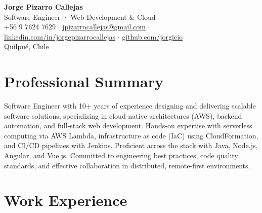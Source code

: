 \documentclass[11pt,a4paper]{article}
\begin{document}
\begin{center}
    {\Huge \textbf{Jorge Pizarro Callejas}}\\[4pt]
    {\large Software Engineer · Web Development \& Cloud}\\[6pt]
    +56 9 7624 7629 \; $\cdot$ \; \href{mailto:jpizarrocallejas@gmail.com}{jpizarrocallejas@gmail.com} \; $\cdot$ \;
    \href{https://linkedin.com/in/jorgepizarrocallejas}{linkedin.com/in/jorgepizarrocallejas} \; $\cdot$ \;
    \href{https://github.com/jorgicio}{github.com/jorgicio}\\[2pt]
    Quilpué, Chile
\end{center}

\vspace{4pt}

\section*{Professional Summary}
Software Engineer with 10+ years of experience designing and delivering scalable software solutions, specializing in cloud-native architectures (AWS), backend automation, and full-stack web development. Hands-on expertise with serverless computing via AWS Lambda, infrastructure as code (IaC) using CloudFormation, and CI/CD pipelines with Jenkins. Proficient across the stack with Java, Node.js, Angular, and Vue.js. Committed to engineering best practices, code quality standards, and effective collaboration in distributed, remote-first environments.



\section*{Work Experience}
\end{document}
